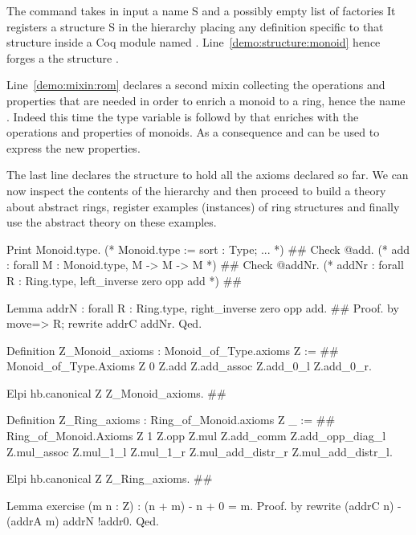 \documentclass[a4paper,UKenglish,cleveref, autoref]{lipics-v2019}
\newcommand{\mixin}{mixin}
\newcommand{\factories}{factories}
\theoremstyle{implem}
\theoremstyle{implem}
\theoremstyle{axiom}
\theoremstyle{abscommand}
\theoremstyle{command}
\begin{document}
The  command takes in input a name S and a possibly
empty list of \factories{}
It registers a structure S in the hierarchy placing
any definition specific to that structure inside a Coq module named .
Line~\ref{demo:structure:monoid} hence forges a the structure .

Line~\ref{demo:mixin:rom} declares a second \mixin{} collecting the operations
and properties that are needed in order to enrich a monoid to a ring, hence
the name . Indeed this time the type variable 
is followd by  that enriches
 with the operations and properties of monoids. As a consequence
 and  can be used to express the new properties.

The last line declares the structure  to hold all the axioms declared
so far. We can now inspect the contents of the hierarchy and then
proceed to build a theory about abstract rings,
register examples (instances) of ring structures
and finally use the abstract theory on these examples.

\begin{coqcode}
Print Monoid.type. (* Monoid.type  :=  { sort : Type;  ... }                           *) #\label{demo:theory:print:type}#
Check @add.        (* add          :   forall M : Monoid.type, M -> M -> M             *) #\label{demo:theory:check:add}#
Check @addNr.      (* addNr        :   forall R : Ring.type, left_inverse zero opp add *) #\label{demo:theory:check:addNr}#

Lemma addrN : forall R : Ring.type, right_inverse zero opp add.                 #\label{demo:theory:state:addrN}#
Proof. by move=> R; rewrite addrC addNr. Qed.

Definition Z_Monoid_axioms : Monoid_of_Type.axioms Z :=                         #\label{demo:theory:z:monoid:axioms}#
  Monoid_of_Type.Axioms Z 0 Z.add
    Z.add_assoc Z.add_0_l Z.add_0_r.

Elpi hb.canonical Z Z_Monoid_axioms.                                            #\label{demo:theory:z:monoid:canonical}#

Definition Z_Ring_axioms : Ring_of_Monoid.axioms Z _ :=                        #\label{demo:theory:z:ring:axioms}#
  Ring_of_Monoid.Axioms Z 1 Z.opp Z.mul
    Z.add_comm Z.add_opp_diag_l Z.mul_assoc Z.mul_1_l Z.mul_1_r
    Z.mul_add_distr_r Z.mul_add_distr_l.

Elpi hb.canonical Z Z_Ring_axioms.                                              #\label{demo:theory:z:ring:canonical}#

Lemma exercise (m n : Z) : (n + m) - n + 0 = m.
Proof. by rewrite (addrC n) -(addrA m) addrN !addr0. Qed.
\end{coqcode}
\end{document}
